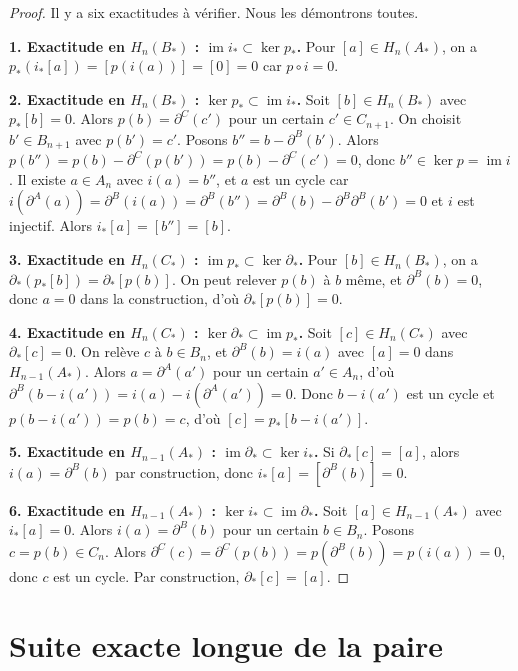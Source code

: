 \documentclass[12pt,a4paper,openany]{book}
\theoremstyle{definition}
\theoremstyle{plain}
\theoremstyle{remark}
\DeclareMathOperator{\im}{im}
\begin{document}
\begin{proof}
Il y a six exactitudes à vérifier. Nous les démontrons toutes.

\textbf{1. Exactitude en $H_n(B_*)$ : $\im i_* \subset \ker p_*$.}
Pour $[a] \in H_n(A_*)$, on a $p_*(i_*[a]) = [p(i(a))] = [0] = 0$ car $p \circ i = 0$.

\textbf{2. Exactitude en $H_n(B_*)$ : $\ker p_* \subset \im i_*$.}
Soit $[b] \in H_n(B_*)$ avec $p_*[b] = 0$. Alors $p(b) = \partial^C(c')$ pour un certain
$c' \in C_{n+1}$. On choisit $b' \in B_{n+1}$ avec $p(b') = c'$. Posons $b'' = b - \partial^B(b')$.
Alors $p(b'') = p(b) - \partial^C(p(b')) = p(b) - \partial^C(c') = 0$, donc $b'' \in \ker p = \im i$.
Il existe $a \in A_n$ avec $i(a) = b''$, et $a$ est un cycle car $i(\partial^A(a)) = \partial^B(i(a)) = \partial^B(b'') = \partial^B(b) - \partial^B\partial^B(b') = 0$
et $i$ est injectif. Alors $i_*[a] = [b''] = [b]$.

\textbf{3. Exactitude en $H_n(C_*)$ : $\im p_* \subset \ker \partial_*$.}
Pour $[b] \in H_n(B_*)$, on a $\partial_*(p_*[b]) = \partial_*[p(b)]$. On peut relever
$p(b)$ à $b$ même, et $\partial^B(b) = 0$, donc $a = 0$ dans la construction, d'où $\partial_*[p(b)] = 0$.

\textbf{4. Exactitude en $H_n(C_*)$ : $\ker \partial_* \subset \im p_*$.}
Soit $[c] \in H_n(C_*)$ avec $\partial_*[c] = 0$. On relève $c$ à $b \in B_n$, et $\partial^B(b) = i(a)$
avec $[a] = 0$ dans $H_{n-1}(A_*)$. Alors $a = \partial^A(a')$ pour un certain $a' \in A_n$,
d'où $\partial^B(b - i(a')) = i(a) - i(\partial^A(a')) = 0$. Donc $b - i(a')$ est un cycle et
$p(b - i(a')) = p(b) = c$, d'où $[c] = p_*[b - i(a')]$.

\textbf{5. Exactitude en $H_{n-1}(A_*)$ : $\im \partial_* \subset \ker i_*$.}
Si $\partial_*[c] = [a]$, alors $i(a) = \partial^B(b)$ par construction, donc $i_*[a] = [\partial^B(b)] = 0$.

\textbf{6. Exactitude en $H_{n-1}(A_*)$ : $\ker i_* \subset \im \partial_*$.}
Soit $[a] \in H_{n-1}(A_*)$ avec $i_*[a] = 0$. Alors $i(a) = \partial^B(b)$ pour un certain
$b \in B_n$. Posons $c = p(b) \in C_n$. Alors $\partial^C(c) = \partial^C(p(b)) = p(\partial^B(b)) = p(i(a)) = 0$,
donc $c$ est un cycle. Par construction, $\partial_*[c] = [a]$.
\end{proof}

\section{Suite exacte longue de la paire}\label{sec:suite-exacte-paire}
\end{document}
